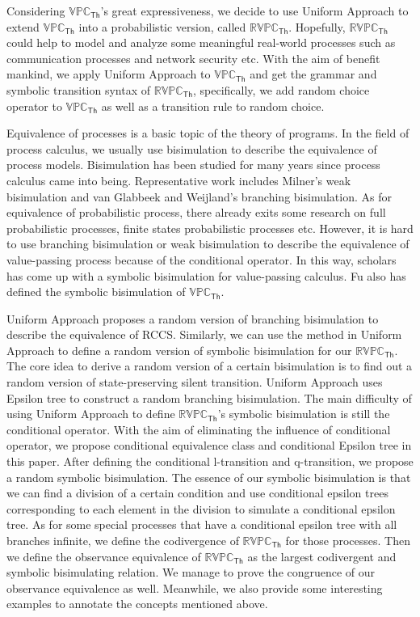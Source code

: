 \begin{digest}
  Considering $\mathbb{VPC}_{\mathsf{Th}}$'s great expressiveness, we decide to use Uniform Approach to extend $\mathbb{VPC}_{\mathsf{Th}}$ into a probabilistic version, called $\mathbb{RVPC}_{\mathsf{Th}}$. Hopefully, $\mathbb{RVPC}_{\mathsf{Th}}$ could help to model and analyze some meaningful real-world processes such as communication processes and network security etc. With the aim of benefit mankind, we apply Uniform Approach to $\mathbb{VPC}_{\mathsf{Th}}$ and get the grammar and symbolic transition syntax of $\mathbb{RVPC}_{\mathsf{Th}}$, specifically, we add random choice operator to $\mathbb{VPC}_{\mathsf{Th}}$ as well as a transition rule to random choice. 
  
  Equivalence of processes is a basic topic of the theory of programs. In the field of process calculus, we usually use bisimulation to describe the equivalence of process models. Bisimulation has been studied for many years since process calculus came into being. Representative work includes Milner's weak bisimulation and van Glabbeek and Weijland's branching bisimulation. As for equivalence of probabilistic process, there already exits some research on full probabilistic processes, finite states probabilistic processes etc. However, it is hard to use branching bisimulation or weak bisimulation to describe the equivalence of value-passing process because of the conditional operator. In this way, scholars has come up with a symbolic bisimulation for value-passing calculus. Fu also has defined the symbolic bisimulation of $\mathbb{VPC}_{\mathsf{Th}}$. 
  
  Uniform Approach proposes a random version of branching bisimulation to describe the equivalence of RCCS. Similarly, we can use the method in Uniform Approach to define a random version of symbolic bisimulation for our $\mathbb{RVPC}_{\mathsf{Th}}$. The core idea to derive a random version of a certain bisimulation is to find out a random version of state-preserving silent transition. Uniform Approach uses Epsilon tree to construct a random branching bisimulation. The main difficulty of using Uniform Approach to define $\mathbb{RVPC}_{\mathsf{Th}}$'s symbolic bisimulation is still the conditional operator. With the aim of eliminating the influence of conditional operator, we propose conditional equivalence class and conditional Epsilon tree in this paper. After defining the conditional l-transition and q-transition, we propose a random symbolic bisimulation. The essence of our symbolic bisimulation is that we can find a division of a certain condition and use conditional epsilon trees corresponding to each element in the division to simulate a conditional epsilon tree. As for some special processes that have a conditional epsilon tree with all branches infinite, we define the codivergence of $\mathbb{RVPC}_{\mathsf{Th}}$ for those processes. Then we define the observance equivalence of $\mathbb{RVPC}_{\mathsf{Th}}$ as the largest codivergent and symbolic bisimulating relation. We manage to prove the congruence of our observance equivalence as well. Meanwhile, we also provide some interesting examples to annotate the concepts mentioned above.
  

\end{digest}
